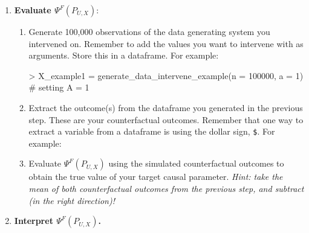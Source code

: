 \documentclass[answers]{exam}
\begin{document}
\begin{enumerate}
\begin{enumerate}
\begin{Schunk}
\end{Schunk}
\end{enumerate}
\item \textbf{Evaluate $\Psi^F(P_{U,X})$}:
\begin{enumerate}
\item Generate 100,000 observations of the data generating system you intervened on. Remember to add the values you want to intervene with as arguments. Store this in a dataframe. For example:
\begin{Schunk}
\begin{Sinput}
> X_example1 = generate_data_intervene_example(n = 100000, a = 1) # setting A = 1
\end{Sinput}
\end{Schunk}
\item Extract the outcome(s) from the dataframe you generated in the previous step. These are your counterfactual outcomes. Remember that one way to extract a variable from a dataframe is using the dollar sign, \texttt{\$}. For example:
\begin{Schunk}
\end{Schunk}
\item Evaluate $\Psi^F(P_{U,X})$ using the simulated counterfactual outcomes to obtain the true value of your target causal parameter. \textit{Hint: take the mean of both counterfactual outcomes from the previous step, and subtract (in the right direction)!}
\end{enumerate}
\item \textbf{Interpret $\Psi^F(P_{U,X})$.}
\end{enumerate}
\end{document}
